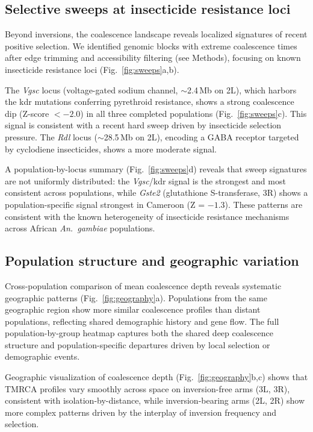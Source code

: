 \documentclass[10pt]{article}
\begin{document}
\subsection*{Selective sweeps at insecticide resistance loci}

Beyond inversions, the coalescence landscape reveals localized signatures of
recent positive selection. We identified genomic blocks with extreme
coalescence times after edge trimming and accessibility filtering (see
Methods), focusing on known insecticide resistance loci
(Fig.~\ref{fig:sweeps}a,b).

The \textit{Vgsc} locus (voltage-gated sodium channel, $\sim$2.4\,Mb on 2L),
which harbors the kdr mutations conferring pyrethroid resistance, shows a
strong coalescence dip (Z-score $< -2.0$) in all three completed populations
(Fig.~\ref{fig:sweeps}c). This signal is consistent with a recent hard sweep
driven by insecticide selection pressure. The \textit{Rdl} locus ($\sim$28.5\,Mb
on 2L), encoding a GABA receptor targeted by cyclodiene insecticides, shows a
more moderate signal.

A population-by-locus summary (Fig.~\ref{fig:sweeps}d) reveals that sweep
signatures are not uniformly distributed: the \textit{Vgsc}/kdr signal is
the strongest and most consistent across populations, while \textit{Gste2}
(glutathione S-transferase, 3R) shows a population-specific signal strongest
in Cameroon (Z = $-1.3$). These patterns are consistent with the known
heterogeneity of insecticide resistance mechanisms across African
\textit{An.~gambiae} populations.

\subsection*{Population structure and geographic variation}

Cross-population comparison of mean coalescence depth reveals systematic
geographic patterns (Fig.~\ref{fig:geography}a). Populations from the same
geographic region show more similar coalescence profiles than distant
populations, reflecting shared demographic history and gene flow. The
full population-by-group heatmap captures both the shared deep coalescence
structure and population-specific departures driven by local selection or
demographic events.

Geographic visualization of coalescence depth
(Fig.~\ref{fig:geography}b,c) shows that TMRCA profiles vary smoothly
across space on inversion-free arms (3L, 3R), consistent with
isolation-by-distance, while inversion-bearing arms (2L, 2R) show more
complex patterns driven by the interplay of inversion frequency and
selection.
\end{document}
